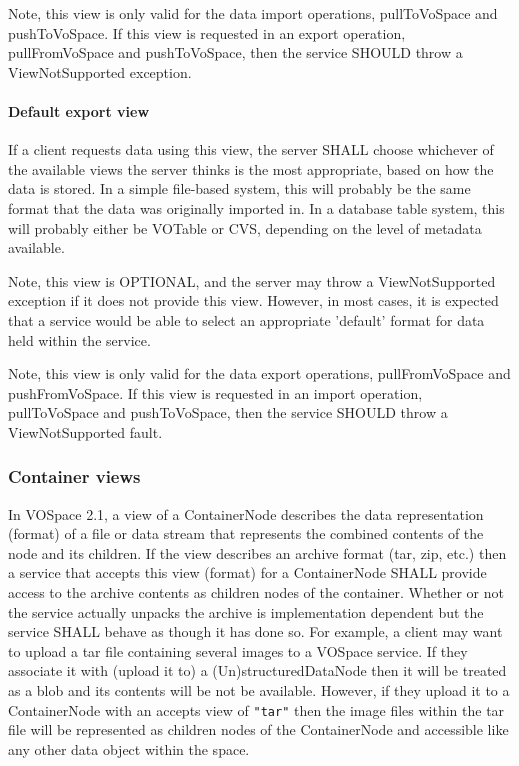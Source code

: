 \documentclass[11pt,a4paper]{ivoa}
\begin{document}
Note, this view is only valid for the data import operations, pullToVoSpace and pushToVoSpace. If this view is requested in an export operation, pullFromVoSpace and pushToVoSpace, then the service SHOULD throw a ViewNotSupported exception.

\paragraph{Default export view}
If a client requests data using this view, the server SHALL choose whichever of the available views the server thinks is the most appropriate, based on how the data is stored. In a simple file-based system, this will probably be the same format that the data was originally imported in. In a database table system, this will probably either be VOTable or CVS, depending on the level of metadata available.

Note, this view is OPTIONAL, and the server may throw a ViewNotSupported exception if it does not provide this view. However, in most cases, it is expected that a service would be able to select an appropriate 'default' format for data held within the service.

Note, this view is only valid for the data export operations, pullFromVoSpace and pushFromVoSpace. If this view is requested in an import operation, pullToVoSpace and pushToVoSpace, then the service SHOULD throw a ViewNotSupported fault.

\subsubsection{Container views}
\label{subsubsec:container views}
In VOSpace 2.1, a view of a ContainerNode describes the data representation (format) of a file or data stream that represents the combined contents of the node and its children. If the view describes an archive format (tar, zip, etc.) then a service that accepts this view (format) for a ContainerNode SHALL provide access to the archive contents as children nodes of the container. Whether or not the service actually unpacks the archive is implementation dependent but the service SHALL behave as though it has done so. For example, a client may want to upload a tar file containing several images to a VOSpace service. If they associate it with (upload it to) a (Un)structuredDataNode then it will be treated as a blob and its contents will be not be available. However, if they upload it to a ContainerNode with an accepts view of \verb|"tar"| then the image files within the tar file will be represented as children nodes of the ContainerNode and accessible like any other data object within the space.
\end{document}
